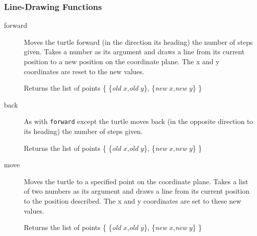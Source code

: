 \subsubsection{Line-Drawing Functions}
\begin{description}
\item[forward]
  Moves the turtle forward (in the direction its heading)
       the number of steps given. Takes a number as its argument and draws
       a line from its current position to a new position on the
       coordinate plane. The x and y coordinates are reset to the new
       values.

       Returns the list of points
    \{ \{\textit{old} $x$,\textit{old} $y$\}, \{\textit{new} $x$,\textit{new} $y$\} \}


     \item[back]
       As with \texttt{forward} except the turtle moves back (in the
       opposite direction to its heading) the number of steps given.

       Returns the list of points
    \{ \{\textit{old} $x$,\textit{old} $y$\}, \{\textit{new} $x$,\textit{new} $y$\} \}


     \item[move]
       Moves the turtle to a specified point on the coordinate
       plane. Takes a list of two numbers as its argument and draws a line
       from its current position to the position described. The x and y
       coordinates are set to these new values.

       Returns the list of points
    \{ \{\textit{old} $x$,\textit{old} $y$\}, \{\textit{new} $x$,\textit{new} $y$\} \}


\end{description}

